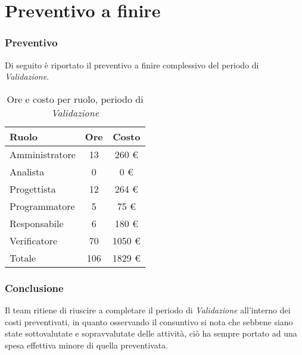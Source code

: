 \section{Preventivo a finire}
\subsubsection{Preventivo}
Di seguito \`e riportato il preventivo a finire complessivo del periodo di \textit{Validazione}.

\begin{table}[H]
	\centering
	\begin{tabular}{ l c c }
		\textbf{Ruolo} & \textbf{Ore} & \textbf{Costo} \\
		\hline
		Amministratore & 13 & 260 \euro{} \\
		Analista & 0 & 0 \euro{} \\
		Progettista & 12 & 264 \euro{} \\
		Programmatore & 5 & 75 \euro{} \\
		Responsabile & 6 & 180 \euro{} \\
		Verificatore & 70 & 1050 \euro{} \\
		\hline
		Totale & 106 & 1829 \euro{} \\
		\hline
	\end{tabular}
	\caption{Ore e costo per ruolo, periodo di \textit{Validazione}}
\end{table}


\subsubsection{Conclusione}
Il team ritiene di riuscire a completare il periodo di \textit{Validazione} all'interno dei costi preventivati, in quanto osservando il consuntivo si nota che sebbene siano state sottovalutate e sopravvalutate delle attivit\`a, ci\`o ha sempre portato ad una spesa effettiva minore di quella preventivata.

\newpage